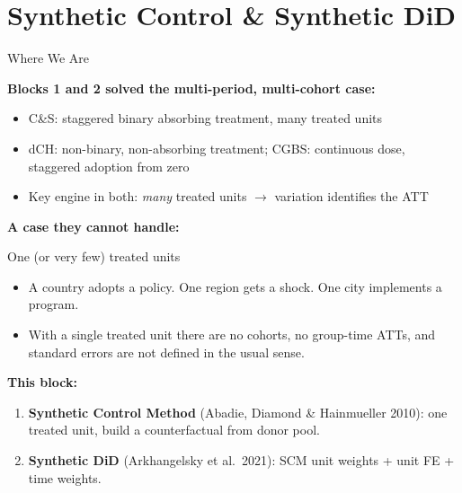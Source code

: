 \documentclass[main.tex]{subfiles}
\begin{document}
\section{Synthetic Control \& Synthetic DiD}

\begin{frame}{Where We Are}

  \textbf{Blocks 1 and 2 solved the multi-period, multi-cohort case:}
  \begin{itemize}\small
    \item C\&S: staggered binary absorbing treatment, many treated units
    \item dCH: non-binary, non-absorbing treatment; CGBS: continuous dose,
      staggered adoption from zero
    \item Key engine in both: \emph{many} treated units $\to$ variation
      identifies the ATT
  \end{itemize}

  \medskip
  \textbf{A case they cannot handle:}

  \begin{alertblock}{One (or very few) treated units}
    \begin{itemize}
      \item A country adopts a policy.  One region gets a shock.
        One city implements a program.
      \item With a single treated unit there are no cohorts, no
        group-time ATTs, and standard errors are not defined
        in the usual sense.
    \end{itemize}
  \end{alertblock}

  \medskip
  \textbf{This block:}
  \begin{enumerate}
    \item \textbf{Synthetic Control Method} (Abadie, Diamond \&
      Hainmueller 2010): one treated unit, build a counterfactual
      from donor pool.
    \item \textbf{Synthetic DiD} (Arkhangelsky et al.\ 2021): SCM unit
      weights + unit FE + time weights.
  \end{enumerate}

\end{frame}
\end{document}
